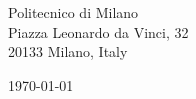 \begin{minipage}{0.49\textwidth}
\begin{flushleft}
\noindent
Politecnico di Milano \\
Piazza Leonardo da Vinci, 32 \\
20133 Milano, Italy
\end{flushleft}
\end{minipage}
\begin{minipage}{0.47\textwidth}
\begin{flushright}
\today
\end{flushright}
\end{minipage} \\

\newcommand{\univ}{Polytechnic University of Milan}
\newcommand{\univshort}{Polimi}
\newcommand{\dept}{Computer Science}
\newcommand{\degree}{M.Sc.}

